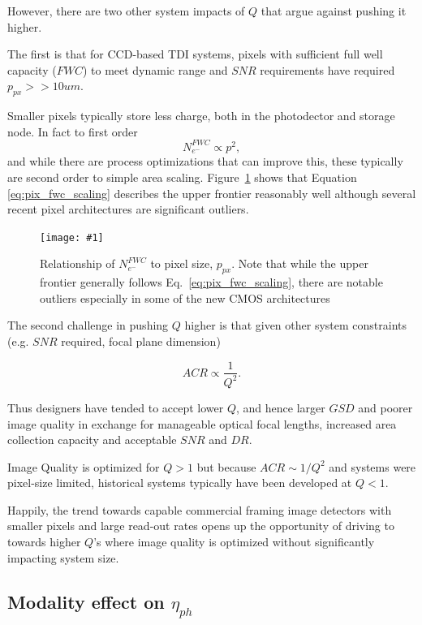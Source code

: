 \documentclass[10pt,journal]{IEEEtran}  %
\newcommand{\includefigure}[3]
{
  \begin{figure}[h!]
  \centering
  \texttt{[image: \#1]}
  \caption[]{#3}
  \label{#2}
  \end{figure}
}
\begin{document}
However, there are two other system impacts of $Q$ that argue against pushing it higher.

The first is that for CCD-based TDI systems, pixels with sufficient full well capacity ($FWC$) to meet dynamic range and $SNR$ requirements have required $p_{px} >> 10um$.

Smaller pixels typically store less charge, both in the photodector and storage node. In fact to first order~\cite{jerram}
\begin{equation}
  \label{eq:pix_fwc_scaling}  
N_{e^-}^{FWC} \propto p^2,
\end{equation}
and while there are process optimizations that can improve this, these typically are second order to simple area scaling.  Figure~\ref{fig:p_fwc} shows that Equation \eqref{eq:pix_fwc_scaling} describes the upper frontier reasonably well although several recent pixel architectures are significant outliers.

\includefigure{figures/p_fwc.pgf}{fig:p_fwc}{Relationship of $N_{e^-}^{FWC}$ to pixel size, $p_{px}$.  Note that while the upper frontier generally follows Eq.~\eqref{eq:pix_fwc_scaling}, there are notable outliers especially in some of the new CMOS architectures}

The second challenge in pushing $Q$ higher is that given other system constraints (e.g. $SNR$ required, focal plane dimension)

\begin{equation}
    ACR \propto \frac{1}{Q^2}.
\end{equation}

Thus designers have tended to accept lower $Q$, and hence larger $GSD$ and poorer image quality in exchange for manageable optical focal lengths, increased area collection capacity and acceptable $SNR$ and $DR$.

\begin{observation}[$Q > 1$]
Image Quality is optimized for $Q>1$ but because $ACR \sim 1/Q^2$ and systems were pixel-size limited, historical systems typically have been developed at $Q<1$.
\end{observation}

Happily, the trend towards capable commercial framing image detectors with smaller pixels and large read-out rates opens up the opportunity of driving to towards higher $Q$'s where image quality is optimized without significantly impacting system size.

\subsection{Modality effect on $\eta_{ph}$}
\label{sec:eta_ph}
\end{document}
